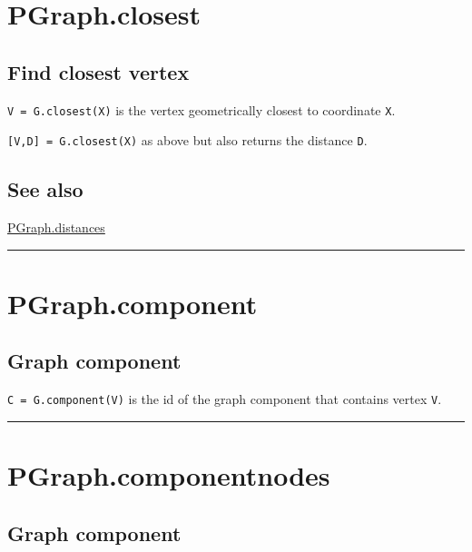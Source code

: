 \hypertarget{PGraph.closest}{\section*{PGraph.closest}}
\subsection*{Find closest vertex}


\texttt{V = G.closest(X)} is the vertex geometrically closest to coordinate \texttt{X}.



\texttt{[V,D] = G.closest(X)} as above but also returns the distance \texttt{D}.


\subsection*{See also}


\hyperlink{PGraph.distances}{\color{blue} PGraph.distances}

\vspace{1.5ex}\hrule

\hypertarget{PGraph.component}{\section*{PGraph.component}}
\subsection*{Graph component}


\texttt{C = G.component(V)} is the id of the graph component that contains vertex
\texttt{V}.

\vspace{1.5ex}\hrule

\hypertarget{PGraph.componentnodes}{\section*{PGraph.componentnodes}}
\subsection*{Graph component}



